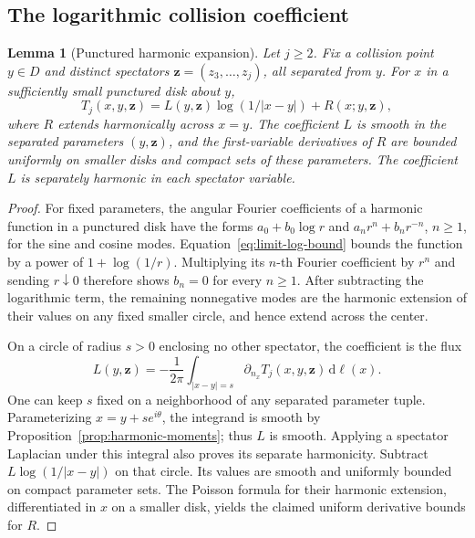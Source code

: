 \documentclass[11pt]{article}
\newtheorem{lemma}[theorem]{Lemma}
\theoremstyle{definition}
\theoremstyle{remark}
\numberwithin{equation}{section}
\begin{document}
\subsection{The logarithmic collision coefficient}

\begin{lemma}[Punctured harmonic expansion]
\label{limit:puncture}
Let \(j\ge2\).  Fix a collision point \(y\in D\) and distinct spectators
\(\mathbf z=(z_3,\ldots,z_j)\), all separated from \(y\).
For \(x\) in a sufficiently small punctured disk about \(y\),
\begin{equation}
 T_j(x,y,\mathbf z)
      =L(y,\mathbf z)\log(1/|x-y|)
                           +R(x;y,\mathbf z),
 \label{eq:limit-puncture}
\end{equation}
where \(R\) extends harmonically across \(x=y\).
The coefficient \(L\) is smooth in the separated parameters
\((y,\mathbf z)\), and the first-variable derivatives of \(R\)
are bounded uniformly on smaller disks and compact sets of these
parameters.  The coefficient \(L\) is separately harmonic in each
spectator variable.
\end{lemma}

\begin{proof}
For fixed parameters, the angular Fourier coefficients of a harmonic
function in a punctured disk have the forms
\(a_0+b_0\log r\) and \(a_nr^n+b_nr^{-n}\), \(n\ge1\), for the
sine and cosine modes.  Equation~\eqref{eq:limit-log-bound} bounds
the function by a power of \(1+\log(1/r)\).  Multiplying its
\(n\)-th Fourier coefficient by \(r^n\) and sending \(r\downarrow0\)
therefore shows \(b_n=0\) for every \(n\ge1\).
After subtracting the logarithmic term, the remaining nonnegative
modes are the harmonic extension of their values on any fixed
smaller circle, and hence extend across the center.

On a circle of radius \(s>0\) enclosing no other spectator,
the coefficient is the flux
\begin{equation}
 L(y,\mathbf z)
   =-\frac1{2\pi}
       \int_{|x-y|=s}\partial_{n_x}T_j(x,y,\mathbf z)\,\mathrm d\ell(x).
 \label{eq:limit-flux}
\end{equation}
One can keep \(s\) fixed on a neighborhood of any separated
parameter tuple.  Parameterizing \(x=y+se^{i\theta}\), the integrand
is smooth by Proposition~\ref{prop:harmonic-moments}; thus \(L\)
is smooth.  Applying a spectator Laplacian under this integral
also proves its separate harmonicity.
Subtract \(L\log(1/|x-y|)\) on that circle.  Its values are
smooth and uniformly bounded on compact parameter sets.
The Poisson formula for their harmonic extension, differentiated
in \(x\) on a smaller disk, yields the claimed uniform derivative
bounds for \(R\).
\end{proof}
\end{document}

